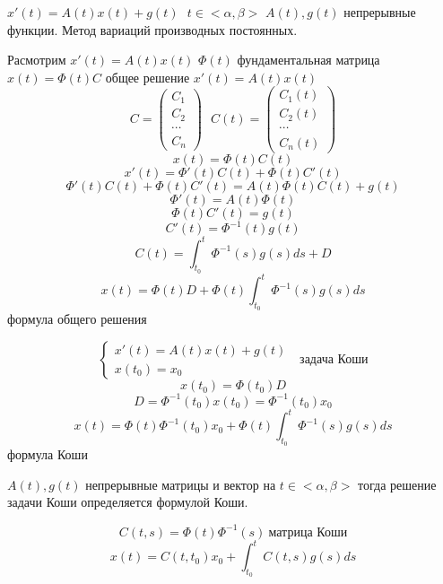 \begin{block}
  $x'(t) = A(t) x(t) + g(t) ~~~ t \in <\alpha, \beta>$ $A(t), g(t)$
  непрерывные функции. Метод вариаций производных постоянных.

  Расмотрим $x'(t) = A(t)x(t)$ $\Phi(t)$ фундаментальная матрица
  $x(t) = \Phi(t) C$ общее решение $x'(t) = A(t)x(t)$
  $$
  C =
  \left(
  \begin{array}{c}
    C_1 \\
    C_2 \\
    \cdots \\
    C_n
  \end{array}
  \right) ~~~
  C(t) =
  \left(
  \begin{array}{c}
    C_1(t) \\
    C_2(t) \\
    \cdots \\
    C_n(t)
  \end{array}
  \right)
  $$
  $$
  x(t) = \Phi(t)C(t)
  $$
  $$
  x'(t) = \Phi'(t)C(t) + \Phi(t)C'(t)
  $$
  $$
  \Phi'(t)C(t) + \Phi(t)C'(t) = A(t)\Phi(t)C(t) + g(t)
  $$
  $$
  \Phi'(t) = A(t) \Phi(t)
  $$
  $$
  \Phi(t)C'(t) = g(t)
  $$
  $$
  C'(t) = \Phi^{-1}(t)g(t)
  $$
  $$
  C(t) = \int_{t_0}^t \Phi^{-1}(s)g(s)ds + D
  $$
  $$
  x(t) = \Phi(t)D + \Phi(t)\int_{t_0}^t\Phi^{-1}(s)g(s)ds
  $$
  формула общего решения
\end{block}

\begin{block}
  $$
  \left\{
  \begin{array}{l}
    x'(t) = A(t)x(t) + g(t) \\
    x(t_0) = x_0
  \end{array}
  \right. ~~~ \text{задача Коши}
  $$
  $$
  x(t_0) = \Phi(t_0)D
  $$
  $$
  D = \Phi^{-1}(t_0)x(t_0) = \Phi^{-1}(t_0)x_0
  $$
  $$
  x(t) = \Phi(t) \Phi^{-1}(t_0)x_0 + \Phi(t)\int_{t_0}^t \Phi^{-1}(s)g(s)ds
  $$
  формула Коши
\end{block}

\begin{theorem}
  $A(t), g(t)$ непрерывные матрицы и вектор на $t \in <\alpha, \beta>$ тогда
  решение задачи Коши определяется формулой Коши.
\end{theorem}

\begin{define}
  $$
  C(t,s) = \Phi(t)\Phi^{-1}(s) ~ \text{матрица Коши}
  $$
  $$
  x(t) = C(t, t_0)x_0 + \int_{t_0}^t C(t,s)g(s)ds
  $$
\end{define}

